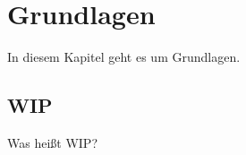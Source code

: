\chapter{Grundlagen}\label{chap:Grundlagen}
In diesem Kapitel geht es um Grundlagen.
\section{\acf{WIP}}
Was heißt \ac{WIP}?